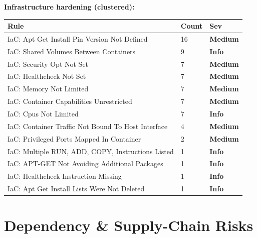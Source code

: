 \documentclass[11pt,a4paper]{article}
\newcommand{\sevbadge}[1]{\textbf{\textcolor{sev#1}{#1}}}
\begin{document}
\noindent\textbf{Infrastructure hardening (clustered):}
{\renewcommand{\arraystretch}{1.2}%
\begin{longtable}{@{}>{\raggedright\arraybackslash}p{} l l@{}}
\toprule\textbf{Rule} & \textbf{Count} & \textbf{Sev}\\\midrule\endhead
{}IaC: Apt Get Install Pin Version Not Defined & 16 & \sevbadge{Medium}\\
{}IaC: Shared Volumes Between Containers & 9 & \sevbadge{Info}\\
{}IaC: Security Opt Not Set & 7 & \sevbadge{Medium}\\
{}IaC: Healthcheck Not Set & 7 & \sevbadge{Medium}\\
{}IaC: Memory Not Limited & 7 & \sevbadge{Medium}\\
{}IaC: Container Capabilities Unrestricted & 7 & \sevbadge{Medium}\\
{}IaC: Cpus Not Limited & 7 & \sevbadge{Info}\\
{}IaC: Container Traffic Not Bound To Host Interface & 4 & \sevbadge{Medium}\\
{}IaC: Privileged Ports Mapped In Container & 2 & \sevbadge{Medium}\\
{}IaC: Multiple RUN, ADD, COPY, Instructions Listed & 1 & \sevbadge{Info}\\
{}IaC: APT-GET Not Avoiding Additional Packages & 1 & \sevbadge{Info}\\
{}IaC: Healthcheck Instruction Missing & 1 & \sevbadge{Info}\\
{}IaC: Apt Get Install Lists Were Not Deleted & 1 & \sevbadge{Info}\\
\bottomrule\end{longtable}}
\clearpage\section*{Dependency \& Supply-Chain Risks}
\end{document}
